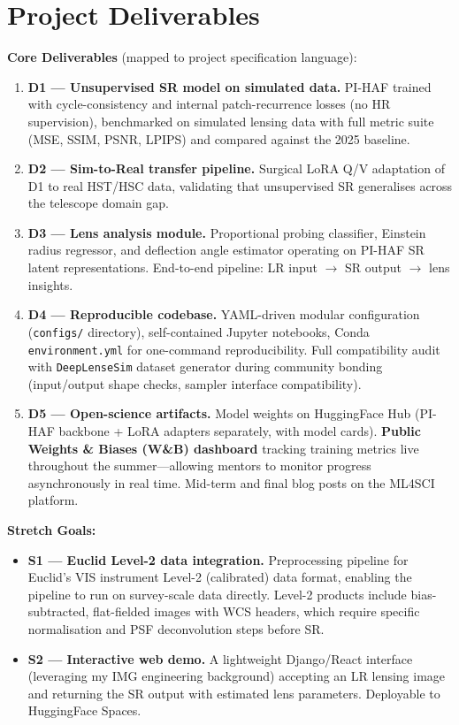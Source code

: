 \documentclass[11pt,a4paper]{article}
\begin{document}
\section{Project Deliverables}

\textbf{Core Deliverables} (mapped to project specification language):

\begin{enumerate}
  \item \textbf{D1 --- Unsupervised SR model on simulated data.} PI-HAF trained with cycle-consistency and internal patch-recurrence losses (no HR supervision), benchmarked on simulated lensing data with full metric suite (MSE, SSIM, PSNR, LPIPS) and compared against the 2025 baseline.

  \item \textbf{D2 --- Sim-to-Real transfer pipeline.} Surgical LoRA Q/V adaptation of D1 to real HST/HSC data, validating that unsupervised SR generalises across the telescope domain gap.

  \item \textbf{D3 --- Lens analysis module.} Proportional probing classifier, Einstein radius regressor, and deflection angle estimator operating on PI-HAF SR latent representations. End-to-end pipeline: LR input $\to$ SR output $\to$ lens insights.

  \item \textbf{D4 --- Reproducible codebase.} YAML-driven modular configuration (\texttt{configs/} directory), self-contained Jupyter notebooks, Conda \texttt{environment.yml} for one-command reproducibility. Full compatibility audit with \texttt{DeepLenseSim} dataset generator during community bonding (input/output shape checks, sampler interface compatibility).

  \item \textbf{D5 --- Open-science artifacts.} Model weights on HuggingFace Hub (PI-HAF backbone + LoRA adapters separately, with model cards). \textbf{Public Weights \& Biases (W\&B) dashboard} tracking training metrics live throughout the summer---allowing mentors to monitor progress asynchronously in real time. Mid-term and final blog posts on the ML4SCI platform.
\end{enumerate}

\textbf{Stretch Goals:}

\begin{itemize}
  \item \textbf{S1 --- Euclid Level-2 data integration.} Preprocessing pipeline for Euclid's VIS instrument Level-2 (calibrated) data format, enabling the pipeline to run on survey-scale data directly. Level-2 products include bias-subtracted, flat-fielded images with WCS headers, which require specific normalisation and PSF deconvolution steps before SR.

  \item \textbf{S2 --- Interactive web demo.} A lightweight Django/React interface (leveraging my IMG engineering background) accepting an LR lensing image and returning the SR output with estimated lens parameters. Deployable to HuggingFace Spaces.
\end{itemize}
\end{document}
